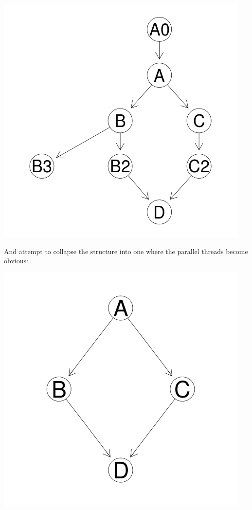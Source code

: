 \documentclass[12pt]{article}
\begin{document}
\centerline{\includegraphics{../codedepends/larger_graph.png}}


And attempt to collapse the structure into one where the parallel threads
become obvious:

\centerline{\includegraphics{../codedepends/simple_graph.png}}
\end{document}
